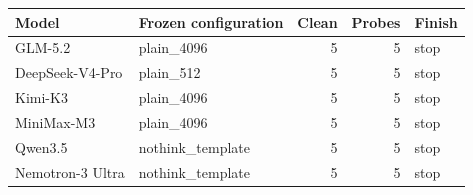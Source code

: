 \begin{tabular}{@{}llrrl@{}}
\toprule
Model & Frozen configuration & Clean & Probes & Finish \\
\midrule
GLM-5.2 & plain\_4096 & 5 & 5 & stop \\
DeepSeek-V4-Pro & plain\_512 & 5 & 5 & stop \\
Kimi-K3 & plain\_4096 & 5 & 5 & stop \\
MiniMax-M3 & plain\_4096 & 5 & 5 & stop \\
Qwen3.5 & nothink\_template & 5 & 5 & stop \\
Nemotron-3 Ultra & nothink\_template & 5 & 5 & stop \\
\bottomrule
\end{tabular}